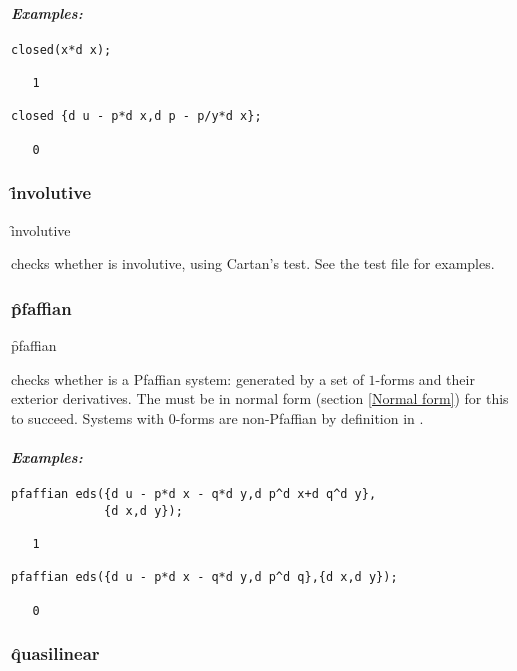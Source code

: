 \paragraph{\textit{Examples:}}
\begin{verbatim}
closed(x*d x);

   1

closed {d u - p*d x,d p - p/y*d x};

   0
\end{verbatim}

\subsubsection{\f{involutive}}
\label{involutive}

\hypertarget{operator:INVOLUTIVE}{}
\begin{syntax}
	\f{involutive} 
\end{syntax}
checks whether  is involutive, using Cartan's test. See the test
file for examples.

\subsubsection{\f{pfaffian}}
\label{pfaffian}

\hypertarget{operator:EDS_PFAFFIAN}{}
\begin{syntax}
	\f{pfaffian} 
\end{syntax}
checks whether  is a Pfaffian system: generated by a set of
$1$-forms and their exterior derivatives. The  must be in normal
form (section \ref{Normal form}) for this to succeed. Systems with 0-forms
are non-Pfaffian by definition in .

\paragraph{\textit{Examples:}}
\begin{verbatim}
pfaffian eds({d u - p*d x - q*d y,d p^d x+d q^d y},
             {d x,d y});

   1

pfaffian eds({d u - p*d x - q*d y,d p^d q},{d x,d y});

   0
\end{verbatim}

\subsubsection{\f{quasilinear}}
\label{quasilinear}

